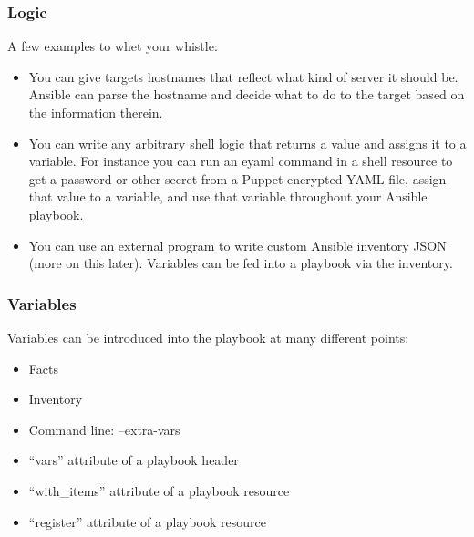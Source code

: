 \documentclass[helvetica,english,utf8,notitle,nologo]{beamer}
\begin{document}
\begin{frame}
  \frametitle{Logic}

  A few examples to whet your whistle:

  \begin{itemize}
  \item You can give targets hostnames that reflect what kind of
    server it should be. Ansible can parse the hostname and decide
    what to do to the target based on the information therein.
  \item You can write any arbitrary shell logic that returns a value
    and assigns it to a variable. For instance you can run an eyaml
    command in a shell resource to get a password or other secret from
    a Puppet encrypted YAML file, assign that value to a variable, and
    use that variable throughout your Ansible playbook.
  \item You can use an external program to write custom Ansible
    inventory JSON (more on this later). Variables can be fed into a
    playbook via the inventory.
  \end{itemize}
\end{frame}

\begin{frame}
  \frametitle{Variables}

  Variables can be introduced into the playbook at many different
  points:

  \begin{itemize}
  \item Facts
  \item Inventory
  \item Command line: --extra-vars
  \item ``vars'' attribute of a playbook header
  \item ``with\_items'' attribute of a playbook resource
  \item ``register'' attribute of a playbook resource
  \end{itemize}
\end{frame}
\end{document}
